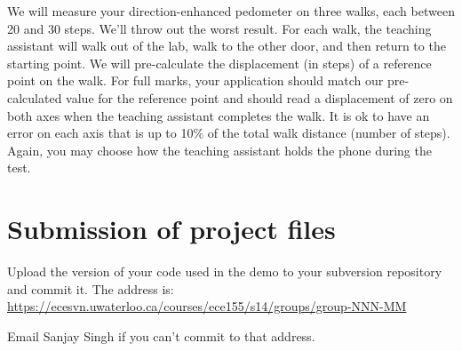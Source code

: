 \documentclass[10pt]{article}
\begin{document}
We will measure your direction-enhanced pedometer on three walks, each between 20 and 30 steps. We'll throw out the worst result. For each walk, the teaching assistant will walk out of the lab, walk to the other door, and then return to the starting point. We will pre-calculate the displacement (in steps) of a reference point on the walk. For full marks, your application should match our pre-calculated value for the reference point and should read a displacement of zero on both axes when the teaching assistant completes the walk. It is ok to have an error on each axis that is up to 10\% of the total walk distance (number of steps). Again, you may choose how the teaching assistant holds the phone during the test.

\section{Submission of project files}

Upload the version of your code used in the demo to your subversion repository and commit it. The address is:
\url{https://ecesvn.uwaterloo.ca/courses/ece155/s14/groups/group-NNN-MM}

Email Sanjay Singh if you can't commit to that address.
\end{document}
